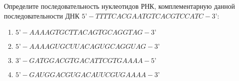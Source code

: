 
Определите последовательность нуклеотидов
РНК, комплементарную данной последовательности ДНК $5’-TTTTCACGAATGTCACGTCCATC-3’$:

\begin{enumerate}
    \item $5’-AAAAGTGCTTACAGTGCAGGTAG-3’$
    \item $5’-AAAAGUGCUUACAGUGCAGGUAG-3’$
    \item $3’-GATGGACGTGACATTCGTGAAAA-5’$
    \item $5’-GAUGGACGUGACAUUCGUGAAAA-3’$
\end{enumerate}




